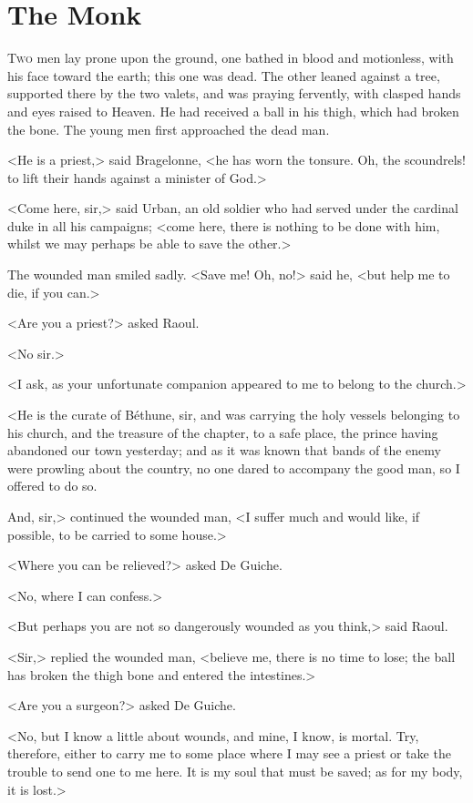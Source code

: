 \chapter{The Monk}

 \lettrine{T}{wo} men lay prone upon the ground, one bathed in blood and motionless, with his face toward the earth; this one was dead. The other leaned against a tree, supported there by the two valets, and was praying fervently, with clasped hands and eyes raised to Heaven. He had received a ball in his thigh, which had broken the bone. The young men first approached the dead man.

<He is a priest,> said Bragelonne, <he has worn the tonsure. Oh, the scoundrels! to lift their hands against a minister of God.>

<Come here, sir,> said Urban, an old soldier who had served under the cardinal duke in all his campaigns; <come here, there is nothing to be done with him, whilst we may perhaps be able to save the other.>

The wounded man smiled sadly. <Save me! Oh, no!> said he, <but help me to die, if you can.>

<Are you a priest?> asked Raoul.

<No sir.>

<I ask, as your unfortunate companion appeared to me to belong to the church.>

<He is the curate of Béthune, sir, and was carrying the holy vessels belonging to his church, and the treasure of the chapter, to a safe place, the prince having abandoned our town yesterday; and as it was known that bands of the enemy were prowling about the country, no one dared to accompany the good man, so I offered to do so.

And, sir,> continued the wounded man, <I suffer much and would like, if possible, to be carried to some house.>

<Where you can be relieved?> asked De Guiche.

<No, where I can confess.>

<But perhaps you are not so dangerously wounded as you think,> said Raoul.

<Sir,> replied the wounded man, <believe me, there is no time to lose; the ball has broken the thigh bone and entered the intestines.>

<Are you a surgeon?> asked De Guiche.

<No, but I know a little about wounds, and mine, I know, is mortal. Try, therefore, either to carry me to some place where I may see a priest or take the trouble to send one to me here. It is my soul that must be saved; as for my body, it is lost.>

